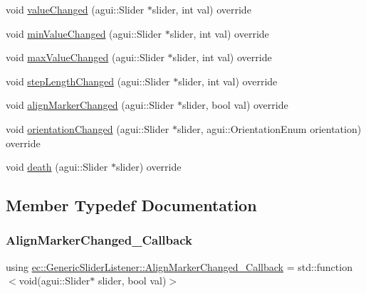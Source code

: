 \begin{DoxyCompactItemize}
\item 
void \mbox{\hyperlink{classec_1_1_generic_slider_listener_a884faf715962f7785174edec063aa145}{value\+Changed}} (agui\+::\+Slider $\ast$slider, int val) override
\item 
void \mbox{\hyperlink{classec_1_1_generic_slider_listener_a1dd803d6b575a549261b9fe04a9da279}{min\+Value\+Changed}} (agui\+::\+Slider $\ast$slider, int val) override
\item 
void \mbox{\hyperlink{classec_1_1_generic_slider_listener_a91d4e65dd9128321b891e01cced50237}{max\+Value\+Changed}} (agui\+::\+Slider $\ast$slider, int val) override
\item 
void \mbox{\hyperlink{classec_1_1_generic_slider_listener_af6958b779d400924196cff0c0d74ff76}{step\+Length\+Changed}} (agui\+::\+Slider $\ast$slider, int val) override
\item 
void \mbox{\hyperlink{classec_1_1_generic_slider_listener_a78e74140590b1719b5c529cdfc2ec425}{align\+Marker\+Changed}} (agui\+::\+Slider $\ast$slider, bool val) override
\item 
void \mbox{\hyperlink{classec_1_1_generic_slider_listener_abd487c83f6c8ff029b474d1c28e743c2}{orientation\+Changed}} (agui\+::\+Slider $\ast$slider, agui\+::\+Orientation\+Enum orientation) override
\item 
void \mbox{\hyperlink{classec_1_1_generic_slider_listener_aceaad6f17199becb59205d1ac57f9a67}{death}} (agui\+::\+Slider $\ast$slider) override
\end{DoxyCompactItemize}


\subsection{Member Typedef Documentation}
\mbox{\label{classec_1_1_generic_slider_listener_a0b14e921e56b7dfc0a23af21f9921e0c}} 
\subsubsection{\texorpdfstring{Align\+Marker\+Changed\+\_\+\+Callback}{AlignMarkerChanged\_Callback}}
{\footnotesize\ttfamily using \mbox{\hyperlink{classec_1_1_generic_slider_listener_a0b14e921e56b7dfc0a23af21f9921e0c}{ec\+::\+Generic\+Slider\+Listener\+::\+Align\+Marker\+Changed\+\_\+\+Callback}} =  std\+::function$<$void(agui\+::\+Slider$\ast$ slider, bool val)$>$}

